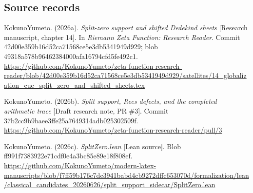 \subsection{Source records}\label{InheritedStructuralStage:source-records}

KokunoYumeto. (2026a). \emph{Split-zero support and shifted Dedekind
sheets} {[}Research manuscript, chapter 14{]}. In \emph{Riemann Zeta
Function: Research Reader}. Commit
42d00e359b16d52ca71568ce5e3db5341949d929; blob
49318a578b96462384000afa16794cfd5fe492c1.
\url{https://github.com/KokunoYumeto/zeta-function-research-reader/blob/42d00e359b16d52ca71568ce5e3db5341949d929/satellites/14_globalization_cue_split_zero_and_shifted_sheets.tex}

KokunoYumeto. (2026b). \emph{Split support, Rees defects, and the
completed arithmetic trace} {[}Draft research note, PR \#3{]}. Commit
37b2cc9b9baee3ffe25a7649314adb025302509f.
\url{https://github.com/KokunoYumeto/zeta-function-research-reader/pull/3}

KokunoYumeto. (2026c). \emph{SplitZero.lean} {[}Lean source{]}. Blob
ff991f7383922e71cdf0e4a3bc85e89e18f808ef.
\url{https://github.com/KokunoYumeto/modern-latex-manuscripts/blob/f7ff59b176c7dc3941babd4cb9272dffc653070d/formalization/lean/classical_candidates_20260626/split_support_sidecar/SplitZero.lean}
